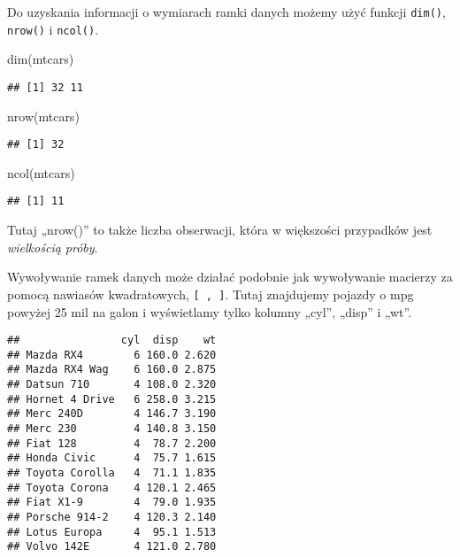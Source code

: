 \documentclass[
]{article}
\newenvironment{Shaded}{\begin{snugshade}}{\end{snugshade}}
\newcommand{\CommentTok}[1]{\textcolor[rgb]{0.56,0.35,0.01}{\textit{#1}}}
\newcommand{\DecValTok}[1]{\textcolor[rgb]{0.00,0.00,0.81}{#1}}
\newcommand{\FunctionTok}[1]{\textcolor[rgb]{0.00,0.00,0.00}{#1}}
\newcommand{\NormalTok}[1]{#1}
\newcommand{\SpecialCharTok}[1]{\textcolor[rgb]{0.00,0.00,0.00}{#1}}
\newcommand{\StringTok}[1]{\textcolor[rgb]{0.31,0.60,0.02}{#1}}
\begin{document}
Do uzyskania informacji o wymiarach ramki danych możemy użyć funkcji
\texttt{dim()}, \texttt{nrow()} i \texttt{ncol()}.

\begin{Shaded}
\begin{Highlighting}[]
\FunctionTok{dim}\NormalTok{(mtcars)}
\end{Highlighting}
\end{Shaded}

\begin{verbatim}
## [1] 32 11
\end{verbatim}

\begin{Shaded}
\begin{Highlighting}[]
\FunctionTok{nrow}\NormalTok{(mtcars)}
\end{Highlighting}
\end{Shaded}

\begin{verbatim}
## [1] 32
\end{verbatim}

\begin{Shaded}
\begin{Highlighting}[]
\FunctionTok{ncol}\NormalTok{(mtcars)}
\end{Highlighting}
\end{Shaded}

\begin{verbatim}
## [1] 11
\end{verbatim}

Tutaj „nrow()'' to także liczba obserwacji, która w większości
przypadków jest \emph{wielkością próby}.

Wywoływanie ramek danych może działać podobnie jak wywoływanie macierzy
za pomocą nawiasów kwadratowych, \texttt{{[}\ ,\ {]}}. Tutaj znajdujemy
pojazdy o mpg powyżej 25 mil na galon i wyświetlamy tylko kolumny
„cyl'', „disp'' i „wt''.

\begin{Shaded}
\end{Shaded}

\begin{verbatim}
##                cyl  disp    wt
## Mazda RX4        6 160.0 2.620
## Mazda RX4 Wag    6 160.0 2.875
## Datsun 710       4 108.0 2.320
## Hornet 4 Drive   6 258.0 3.215
## Merc 240D        4 146.7 3.190
## Merc 230         4 140.8 3.150
## Fiat 128         4  78.7 2.200
## Honda Civic      4  75.7 1.615
## Toyota Corolla   4  71.1 1.835
## Toyota Corona    4 120.1 2.465
## Fiat X1-9        4  79.0 1.935
## Porsche 914-2    4 120.3 2.140
## Lotus Europa     4  95.1 1.513
## Volvo 142E       4 121.0 2.780
\end{verbatim}
\end{document}
